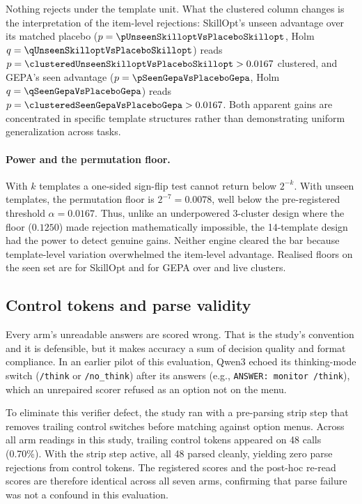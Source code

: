 Nothing rejects under the template unit.
What the clustered column changes is the interpretation of the item-level
rejections: SkillOpt's unseen advantage over its matched placebo ($p = \NUM{\pUnseenSkilloptVsPlaceboSkillopt}$,
Holm $q = \NUM{\qUnseenSkilloptVsPlaceboSkillopt}$) reads $p = \NUM{\clusteredUnseenSkilloptVsPlaceboSkillopt} > 0.0167$
clustered, and GEPA's seen advantage ($p = \NUM{\pSeenGepaVsPlaceboGepa}$,
Holm $q = \NUM{\qSeenGepaVsPlaceboGepa}$) reads $p = \NUM{\clusteredSeenGepaVsPlaceboGepa} > 0.0167$.
Both apparent gains are concentrated in specific template structures rather than
demonstrating uniform generalization across tasks.

\paragraph{Power and the permutation floor.} With $k$ templates a one-sided
sign-flip test cannot return below $2^{-k}$. With \NUM{\templatesUnseen}
unseen templates, the permutation floor is $2^{-7} = 0.0078$, well below the
pre-registered threshold $\alpha = 0.0167$. Thus, unlike an underpowered
3-cluster design where the floor ($0.1250$) made rejection mathematically
impossible, the 14-template design had the power to detect genuine gains.
Neither engine cleared the bar because template-level variation overwhelmed
the item-level advantage. Realised floors on the seen set are
\NUM{\clusteredFloorSeenSkilloptVsPlaceboSkillopt} for SkillOpt and
\NUM{\clusteredFloorSeenGepaVsPlaceboGepa} for GEPA over
\NUM{\clustersSeenSkilloptVsPlaceboSkillopt} and
\NUM{\clustersSeenGepaVsPlaceboGepa} live clusters.

\subsection{Control tokens and parse validity}
\label{sec:parsefail}

Every arm's unreadable answers are scored wrong. That is the study's
convention and it is defensible, but it makes accuracy a sum of decision
quality and format compliance. In an earlier pilot of this evaluation,
Qwen3 echoed its thinking-mode switch (\texttt{/think} or \texttt{/no\_think})
after its answers (e.g., \texttt{ANSWER: monitor /think}), which an unrepaired
scorer refused as an option not on the menu.

To eliminate this verifier defect, the study ran with a pre-parsing strip step
that removes trailing control switches before matching against option menus.
Across all \NUM{\studyReadings} arm readings in this study, trailing control tokens
appeared on 48 calls (0.70\%). With the strip step active, all 48 parsed cleanly,
yielding zero parse rejections from control tokens. The registered scores and
the post-hoc re-read scores are therefore identical across all seven arms,
confirming that parse failure was not a confound in this evaluation.

